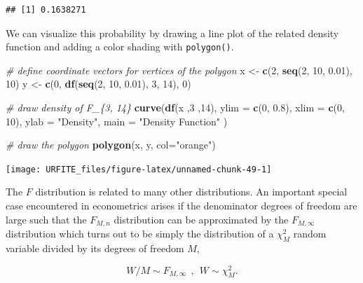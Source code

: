 \documentclass[]{book}
\newenvironment{Shaded}{\begin{snugshade}}{\end{snugshade}}
\newcommand{\KeywordTok}[1]{\textcolor[rgb]{0.13,0.29,0.53}{\textbf{#1}}}
\newcommand{\DataTypeTok}[1]{\textcolor[rgb]{0.13,0.29,0.53}{#1}}
\newcommand{\DecValTok}[1]{\textcolor[rgb]{0.00,0.00,0.81}{#1}}
\newcommand{\FloatTok}[1]{\textcolor[rgb]{0.00,0.00,0.81}{#1}}
\newcommand{\StringTok}[1]{\textcolor[rgb]{0.31,0.60,0.02}{#1}}
\newcommand{\CommentTok}[1]{\textcolor[rgb]{0.56,0.35,0.01}{\textit{#1}}}
\newcommand{\NormalTok}[1]{#1}
\theoremstyle{definition}
\theoremstyle{definition}
\theoremstyle{definition}
\theoremstyle{remark}
\begin{document}
\begin{verbatim}
## [1] 0.1638271
\end{verbatim}

We can visualize this probability by drawing a line plot of the related
density function and adding a color shading with \texttt{polygon()}.

\begin{Shaded}
\begin{Highlighting}[]
\CommentTok{# define coordinate vectors for vertices of the polygon}
\NormalTok{x <-}\StringTok{ }\KeywordTok{c}\NormalTok{(}\DecValTok{2}\NormalTok{, }\KeywordTok{seq}\NormalTok{(}\DecValTok{2}\NormalTok{, }\DecValTok{10}\NormalTok{, }\FloatTok{0.01}\NormalTok{), }\DecValTok{10}\NormalTok{)}
\NormalTok{y <-}\StringTok{ }\KeywordTok{c}\NormalTok{(}\DecValTok{0}\NormalTok{, }\KeywordTok{df}\NormalTok{(}\KeywordTok{seq}\NormalTok{(}\DecValTok{2}\NormalTok{, }\DecValTok{10}\NormalTok{, }\FloatTok{0.01}\NormalTok{), }\DecValTok{3}\NormalTok{, }\DecValTok{14}\NormalTok{), }\DecValTok{0}\NormalTok{)}

\CommentTok{# draw density of F_\{3, 14\}}
\KeywordTok{curve}\NormalTok{(}\KeywordTok{df}\NormalTok{(x ,}\DecValTok{3}\NormalTok{ ,}\DecValTok{14}\NormalTok{), }
      \DataTypeTok{ylim =} \KeywordTok{c}\NormalTok{(}\DecValTok{0}\NormalTok{, }\FloatTok{0.8}\NormalTok{), }
      \DataTypeTok{xlim =} \KeywordTok{c}\NormalTok{(}\DecValTok{0}\NormalTok{, }\DecValTok{10}\NormalTok{), }
      \DataTypeTok{ylab =} \StringTok{"Density"}\NormalTok{,}
      \DataTypeTok{main =} \StringTok{"Density Function"}
\NormalTok{      )}

\CommentTok{# draw the polygon}
\KeywordTok{polygon}\NormalTok{(x, y, }\DataTypeTok{col=}\StringTok{"orange"}\NormalTok{)}
\end{Highlighting}
\end{Shaded}

\begin{center}\texttt{[image: URFITE\_files/figure-latex/unnamed-chunk-49-1]} \end{center}

The \(F\) distribution is related to many other distributions. An
important special case encountered in econometrics arises if the
denominator degrees of freedom are large such that the \(F_{M,n}\)
distribution can be approximated by the \(F_{M,\infty}\) distribution
which turns out to be simply the distribution of a \(\chi^2_M\) random
variable divided by its degrees of freedom \(M\),

\[ W/M \sim F_{M,\infty} \ \ , \ \ W \sim \chi^2_M. \]
\end{document}
